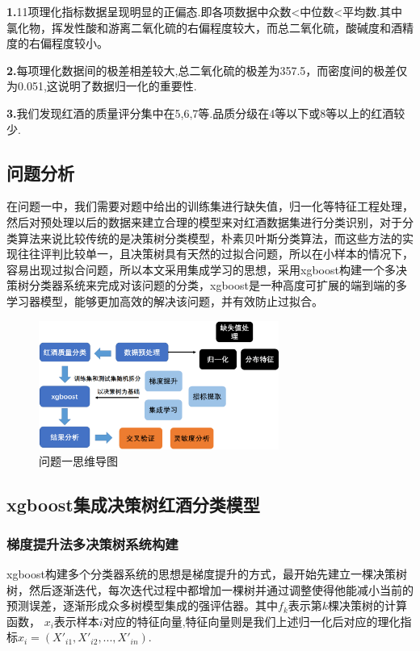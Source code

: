\documentclass{whutmod}
\newcommand{\upcite}[1]{\textsuperscript{\textsuperscript{\cite{#1}}}}
\begin{document}
\textbf{1.}11项理化指标数据呈现明显的正偏态.即各项数据中众数<中位数<平均数.其中氯化物，挥发性酸和游离二氧化硫的右偏程度较大，而总二氧化硫，酸碱度和酒精度的右偏程度较小。

\textbf{2.}每项理化数据间的极差相差较大,总二氧化硫的极差为357.5，而密度间的极差仅为0.051,这说明了数据归一化的重要性.

\textbf{3.}我们发现红酒的质量评分集中在5,6,7等.品质分级在4等以下或8等以上的红酒较少.


\subsection{问题分析}
在问题一中，我们需要对题中给出的训练集进行缺失值，归一化等特征工程处理，然后对预处理以后的数据来建立合理的模型来对红酒数据集进行分类识别，对于分类算法来说比较传统的是决策树分类模型，朴素贝叶斯分类算法，而这些方法的实现往往评判比较单一，且决策树具有天然的过拟合问题，所以在小样本的情况下，容易出现过拟合问题，所以本文采用集成学习的思想，采用xgboost构建一个多决策树分类器系统来完成对该问题的分类，xgboost是一种高度可扩展的端到端的多学习器模型，能够更加高效的解决该问题，并有效防止过拟合。
\begin{figure}[!htbp]
	\centering
	\includegraphics[width=0.7\textwidth]{map1.png}
	\caption{问题一思维导图}
\end{figure} 


\subsection{xgboost集成决策树红酒分类模型}

\subsubsection{梯度提升法多决策树系统构建}
xgboost构建多个分类器系统的思想是梯度提升的方式，最开始先建立一棵决策树树，然后逐渐迭代，每次迭代过程中都增加一棵树并通过调整使得他能减小当前的预测误差，逐渐形成众多树模型集成的强评估器。其中$f_k$表示第$k$棵决策树的计算函数， $x_i$表示样本$i$对应的特征向量,特征向量则是我们上述归一化后对应的理化指标$x_i=(X'_{i1},X'_{i2},...,X'_{in})$.
\end{document}
